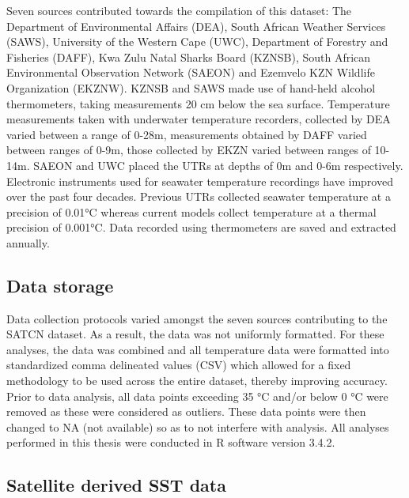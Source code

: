 \documentclass[12pt,]{article}
\begin{document}
Seven sources contributed towards the compilation of this dataset: The
Department of Environmental Affairs (DEA), South African Weather
Services (SAWS), University of the Western Cape (UWC), Department of
Forestry and Fisheries (DAFF), Kwa Zulu Natal Sharks Board (KZNSB),
South African Environmental Observation Network (SAEON) and Ezemvelo KZN
Wildlife Organization (EKZNW). KZNSB and SAWS made use of hand-held
alcohol thermometers, taking measurements 20 cm below the sea surface.
Temperature measurements taken with underwater temperature recorders,
collected by DEA varied between a range of 0-28m, measurements obtained
by DAFF varied between ranges of 0-9m, those collected by EKZN varied
between ranges of 10-14m. SAEON and UWC placed the UTRs at depths of 0m
and 0-6m respectively. Electronic instruments used for seawater
temperature recordings have improved over the past four decades.
Previous UTRs collected seawater temperature at a precision of 0.01°C
whereas current models collect temperature at a thermal precision of
0.001°C. Data recorded using thermometers are saved and extracted
annually.

\subsection{Data storage}\label{data-storage}

Data collection protocols varied amongst the seven sources contributing
to the SATCN dataset. As a result, the data was not uniformly formatted.
For these analyses, the data was combined and all temperature data were
formatted into standardized comma delineated values (CSV) which allowed
for a fixed methodology to be used across the entire dataset, thereby
improving accuracy. Prior to data analysis, all data points exceeding 35
°C and/or below 0 °C were removed as these were considered as outliers.
These data points were then changed to NA (not available) so as to not
interfere with analysis. All analyses performed in this thesis were
conducted in R software version 3.4.2.

\subsection{Satellite derived SST
data}\label{satellite-derived-sst-data}
\end{document}
